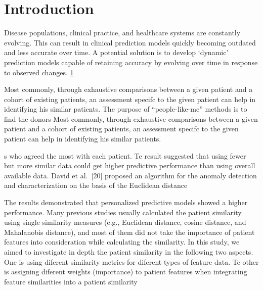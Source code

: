 \documentclass{article}
\begin{document}

\hypertarget{introduction}{%
\section{Introduction}\label{introduction}}

Disease populations, clinical practice, and healthcare systems are
constantly evolving. This can result in clinical prediction models
quickly becoming outdated and less accurate over time. A potential
solution is to develop `dynamic' prediction models capable of retaining
accuracy by evolving over time in response to observed changes.
\href{https://diagnprognres.biomedcentral.com/articles/10.1186/s41512-018-0045-2}{1}

Most commonly, through exhaustive comparisons between a given patient
and a cohort of existing patients, an assessment specifc to the given
patient can help in identifying his similar patients. The purpose of
``people-like-me'' methods is to find the donors Most commonly, through
exhaustive comparisons between a given patient and a cohort of existing
patients, an assessment specifc to the given patient can help in
identifying his similar patients.

s who agreed the most with each patient. Te result suggested that using
fewer but more similar data could get higher predictive performance than
using overall available data. David et al.~{[}20{]} proposed an
algorithm for the anomaly detection and characterization on the basis of
the Euclidean distance

The results demonstrated that personalized predictive models showed a
higher performance. Many previous studies usually calculated the patient
similarity using single similarity measures (e.g., Euclidean distance,
cosine distance, and Mahalanobis distance), and most of them did not
take the importance of patient features into consideration while
calculating the similarity. In this study, we aimed to investigate in
depth the patient similarity in the following two aspects. One is using
diferent similarity metrics for diferent types of feature data. Te other
is assigning diferent weights (importance) to patient features when
integrating feature similarities into a patient similarity
\end{document}
